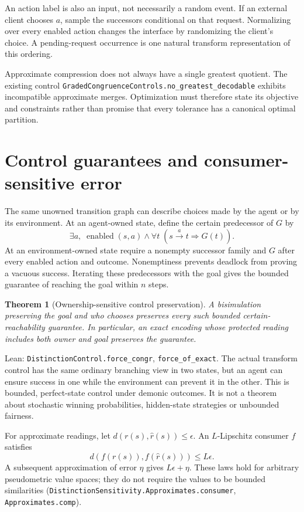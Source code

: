\documentclass[11pt]{article}
\newtheorem{theorem}{Theorem}
\newcommand{\lean}[1]{\nolinkurl{#1}}
\begin{document}
An action label is also an input, not necessarily a random event. If an
external client chooses $a$, sample the successors conditional on that
request. Normalizing over every enabled action changes the interface by
randomizing the client's choice. A pending-request occurrence is one natural
transform representation of this ordering.

Approximate compression does not always have a single greatest quotient.
The existing control \lean{GradedCongruenceControls.no_greatest_decodable}
exhibits incompatible approximate merges. Optimization must therefore state
its objective and constraints rather than promise that every tolerance has
a canonical optimal partition.

\section{Control guarantees and consumer-sensitive error}
The same unowned transition graph can describe choices made by the agent or
by its environment. At an agent-owned state, define the certain predecessor
of $G$ by
\[
 \exists a,\;\operatorname{enabled}(s,a)\land
     \forall t\;(s\xrightarrow{a}t\Rightarrow G(t)).
\]
At an environment-owned state require a nonempty successor family and $G$
after every enabled action and outcome. Nonemptiness prevents deadlock from
proving a vacuous success. Iterating these predecessors with the goal gives
the bounded guarantee of reaching the goal within $n$ steps.

\begin{theorem}[Ownership-sensitive control preservation]
A bisimulation preserving the goal and who chooses preserves every such
bounded certain-reachability guarantee. In particular, an exact encoding
whose protected reading includes both owner and goal preserves the guarantee.
\end{theorem}
\noindent Lean: \lean{DistinctionControl.force_congr},
\lean{force_of_exact}. The actual transform control has the same ordinary
branching view in two states, but an agent can ensure success in one while
the environment can prevent it in the other. This is bounded, perfect-state
control under demonic outcomes. It is not a theorem about stochastic winning
probabilities, hidden-state strategies or unbounded fairness.

For approximate readings, let $d(r(s),\widehat r(s))\le\epsilon$. An
$L$-Lipschitz consumer $f$ satisfies
\[
 d(f(r(s)),f(\widehat r(s)))\le L\epsilon.
\]
A subsequent approximation of error $\eta$ gives $L\epsilon+\eta$.
These laws hold for arbitrary pseudometric value spaces; they do not require
the values to be bounded similarities
(\lean{DistinctionSensitivity.Approximates.consumer}, \lean{Approximates.comp}).
\end{document}
